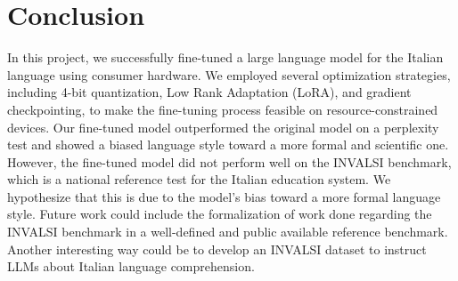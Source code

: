 \documentclass{article}
\begin{document}
	\begin{center}
	\end{center}
	
	 
	\section{Conclusion}
	In this project, we successfully fine-tuned a large language model for the Italian language using consumer hardware. We employed several optimization strategies, including 4-bit quantization, Low Rank Adaptation (LoRA), and gradient checkpointing, to make the fine-tuning process feasible on resource-constrained devices. Our fine-tuned model outperformed the original model on a perplexity test and showed a biased language style toward a more formal and scientific one. 
	However, the fine-tuned model did not perform well on the INVALSI benchmark, which is a national reference test for the Italian education system. We hypothesize that this is due to the model's bias toward a more formal language style.
	Future work could include the formalization of work done regarding the INVALSI benchmark in a well-defined and public available reference benchmark.
	Another interesting way could be to develop an INVALSI dataset to instruct LLMs about Italian language comprehension. 
	
\end{document}
